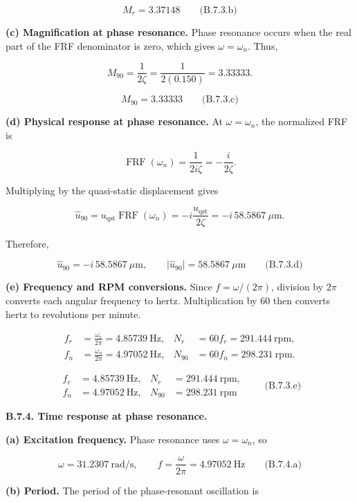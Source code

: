 \[
\boxed{M_r=3.37148}
\qquad\text{(B.7.3.b)}
\]

\textbf{(c) Magnification at phase resonance.} Phase resonance occurs when the real part of the FRF denominator is zero, which gives $\omega=\omega_n$. Thus,

\[
M_{90}=\frac{1}{2\zeta}
 =\frac{1}{2(0.150)}
 =3.33333.
\]

\[
\boxed{M_{90}=3.33333}
\qquad\text{(B.7.3.c)}
\]

\textbf{(d) Physical response at phase resonance.} At $\omega=\omega_n$, the normalized FRF is

\[
\operatorname{FRF}(\omega_n)
 =\frac{1}{2i\zeta}
 =-\frac{i}{2\zeta}.
\]

Multiplying by the quasi-static displacement gives

\[
\hat u_{90}
 =u_{\mathrm{qst}}\operatorname{FRF}(\omega_n)
 =-i\frac{u_{\mathrm{qst}}}{2\zeta}
 =-i\,58.5867\ \mu\mathrm{m}.
\]

Therefore,

\[
\boxed{\hat u_{90}=-i\,58.5867\ \mu\mathrm{m},
\qquad
\lvert\hat u_{90}\rvert=58.5867\ \mu\mathrm{m}}
\qquad\text{(B.7.3.d)}
\]

\textbf{(e) Frequency and RPM conversions.} Since $f=\omega/(2\pi)$, division by $2\pi$ converts each angular frequency to hertz. Multiplication by $60$ then converts hertz to revolutions per minute.

\[
\begin{aligned}
f_r&=\frac{\omega_r}{2\pi}=4.85739\ \mathrm{Hz},
&N_r&=60f_r=291.444\ \mathrm{rpm},\\
f_n&=\frac{\omega_n}{2\pi}=4.97052\ \mathrm{Hz},
&N_{90}&=60f_n=298.231\ \mathrm{rpm}.
\end{aligned}
\]

\[
\boxed{
\begin{aligned}
f_r&=4.85739\ \mathrm{Hz},&N_r&=291.444\ \mathrm{rpm},\\
f_n&=4.97052\ \mathrm{Hz},&N_{90}&=298.231\ \mathrm{rpm}
\end{aligned}}
\qquad\text{(B.7.3.e)}
\]

\textbf{B.7.4. Time response at phase resonance.}

\textbf{(a) Excitation frequency.} Phase resonance uses $\omega=\omega_n$, so

\[
\boxed{\omega=31.2307\ \mathrm{rad/s},
\qquad
f=\frac{\omega}{2\pi}=4.97052\ \mathrm{Hz}}
\qquad\text{(B.7.4.a)}
\]

\textbf{(b) Period.} The period of the phase-resonant oscillation is

